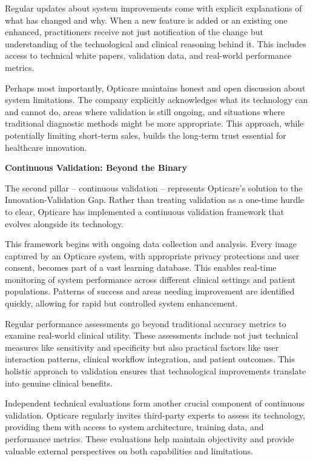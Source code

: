 \documentclass[
  Letterpaper,
]{scrbook}
\begin{document}
Regular updates about system improvements come with explicit
explanations of what has changed and why. When a new feature is added or
an existing one enhanced, practitioners receive not just notification of
the change but understanding of the technological and clinical reasoning
behind it. This includes access to technical white papers, validation
data, and real-world performance metrics.

Perhaps most importantly, Opticare maintains honest and open discussion
about system limitations. The company explicitly acknowledges what its
technology can and cannot do, areas where validation is still ongoing,
and situations where traditional diagnostic methods might be more
appropriate. This approach, while potentially limiting short-term sales,
builds the long-term trust essential for healthcare innovation.

\textbf{Continuous Validation: Beyond the Binary}

The second pillar -- continuous validation -- represents Opticare's
solution to the Innovation-Validation Gap. Rather than treating
validation as a one-time hurdle to clear, Opticare has implemented a
continuous validation framework that evolves alongside its technology.

This framework begins with ongoing data collection and analysis. Every
image captured by an Opticare system, with appropriate privacy
protections and user consent, becomes part of a vast learning database.
This enables real-time monitoring of system performance across different
clinical settings and patient populations. Patterns of success and areas
needing improvement are identified quickly, allowing for rapid but
controlled system enhancement.

Regular performance assessments go beyond traditional accuracy metrics
to examine real-world clinical utility. These assessments include not
just technical measures like sensitivity and specificity but also
practical factors like user interaction patterns, clinical workflow
integration, and patient outcomes. This holistic approach to validation
ensures that technological improvements translate into genuine clinical
benefits.

Independent technical evaluations form another crucial component of
continuous validation. Opticare regularly invites third-party experts to
assess its technology, providing them with access to system
architecture, training data, and performance metrics. These evaluations
help maintain objectivity and provide valuable external perspectives on
both capabilities and limitations.
\end{document}
